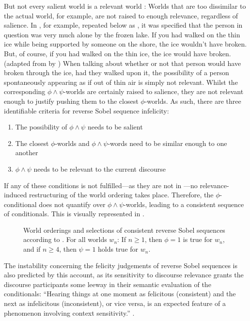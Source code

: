 But not every salient world is a relevant world \textcite{Lewis2018}: Worlds that are too dissimilar to the actual world, for example, are not raised to enough relevance, regardless of salience. In , for example, repeated below as , it was specified that the person in question was very much alone by the frozen lake. 
\ex{} If you had walked on the thin ice while being supported by someone on the shore, the ice wouldn't have broken. But, of course, if you had walked on the thin ice, the ice would have broken.\\%
\emptyfill(adapted from \textcite[p. 166]{Bennett2003} by \textcite[p. 488]{Lewis2018})
\xe
When talking about whether or not that person would have broken through the ice, had they walked upon it, the possibility of a person spontaneously appearing as if out of thin air is simply not relevant. Whilst the corresponding $\phi\land\psi$-worlds are certainly raised to salience, they are not relevant enough to justify pushing them to the closest $\phi$-worlds. As such, there are three identifiable criteria for reverse Sobel sequence infelicity:
\begin{enumerate}
    \item The possibility of $\phi\land\psi$ needs to be salient
    \item The closest $\phi$-worlds and $\phi\land\psi$-words need to be similar enough to one another
    \item $\phi\land\psi$ needs to be relevant to the current discourse
\end{enumerate}
If any of these conditions is not fulfilled---as they are not in ---no relevance-induced restructuring of the world ordering takes place. Therefore, the $\phi$-conditional does not quantify over $\phi\land\psi$-worlds, leading to a consistent sequence of conditionals. This is visually represented in .
\begin{figure}[!htb]

\caption{World orderings and selections of consistent reverse Sobel sequences according to \textcite{Lewis2018}. For all worlds $w_n$: If $n\geqslant1$, then $\phi=1$ is true for $w_n$, and if $n\geqslant 4$, then $\psi=1$ holds true for $w_n$.}
\end{figure}
\noindent The instability concerning the felicity judgements of reverse Sobel sequences is also predicted by this account, as its sensitivity to discourse relevance grants the discourse participants some leeway in their semantic evaluation of the conditionals: \enquote{Hearing things at one moment as felicitous (consistent) and the next as infelicitous (inconsistent), or vice versa, is an expected feature of a phenomenon involving context sensitivity.} \parencite[p. 22]{Lewis2018}.


